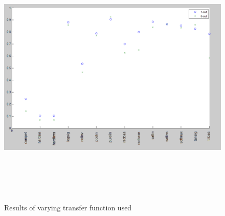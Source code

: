 \documentclass[a4paper]{article}
\begin{document}
\begin{landscape}
\begin{figure}[p]
  \centering
  {\includegraphics[height=120mm]{transfer-function.png}}
  \caption{Results of varying transfer function used}
\end{figure}
\end{landscape}
\end{document}
